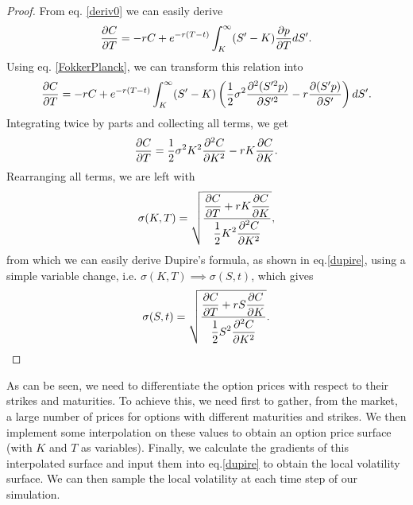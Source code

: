 \begin{proof}
From eq. \ref{deriv0} we can easily derive
\begin{equation}
\pdv{C}{T}=-rC+e^{-r(T-t)}\int_K^\infty(S'-K)\pdv{p}{T}dS'.
\end{equation}
Using eq. \ref{FokkerPlanck}, we can transform this relation into
\begin{equation}
\pdv{C}{T}=-rC+e^{-r(T-t)}\int_K^\infty(S'-K)\left(\frac{1}{2}\sigma^2\pdv{^2(S'^2p)}{S'^2}-r\pdv{(S'p)}{S'}\right)dS'.
\end{equation}
Integrating twice by parts and collecting all terms, we get
\begin{equation}
\pdv{C}{T}=\frac{1}{2}\sigma^2K^2\pdv{^2C}{K^2}-rK\pdv{C}{K}.
\end{equation}
Rearranging all terms, we are left with
\begin{equation}
\sigma(K,T)=\sqrt{\frac{\displaystyle\pdv{C}{T}+rK\pdv{C}{K}}{\displaystyle\frac{1}{2}K^2\pdv{^2C}{K^2}}},
\end{equation}
\noindent from which we can easily derive Dupire's formula, as shown in eq.\eqref{dupire}, using a simple variable change, i.e. $\sigma(K,T)\implies \sigma(S,t)$, which gives
\begin{equation}
\sigma(S,t)=\sqrt{\frac{\displaystyle\pdv{C}{T}+rS\pdv{C}{K}}{\displaystyle\frac{1}{2}S^2\pdv{^2C}{K^2}}}.
\end{equation}
\end{proof}

As can be seen, we need to differentiate the option prices with respect to their strikes and maturities. To achieve this, we need first to gather, from the market, a large number of prices for options with different maturities and strikes. We then implement some interpolation on these values to obtain an option price surface (with $K$ and $T$ as variables). Finally, we calculate the gradients of this interpolated surface and input them into eq.\eqref{dupire} to obtain the local volatility surface.
We can then sample the local volatility at each time step of our simulation.


